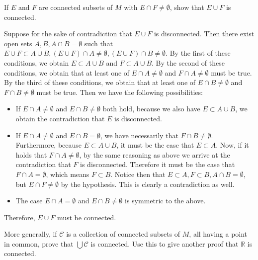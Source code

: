 \begin{exercise}{5}
    If $E$ and $F$ are connected subsets of $M$ with $E \cap F \neq \emptyset$, show that $E \cup F$ is connected.
\end{exercise}

\begin{solution}
    
    Suppose for the sake of contradiction that $E \cup F$ is disconnected.
    Then there exist open sets $A, B, A \cap B = \emptyset$ such that $E \cup F \subset A \cup B, (E \cup F) \cap A \neq \emptyset, (E \cup F) \cap B \neq \emptyset$.
    By the first of these conditions, we obtain $E \subset A \cup B$ and $F \subset A \cup B$.
    By the second of these conditions, we obtain that at least one of $E \cap A \neq \emptyset$ and $F \cap A \neq \emptyset$ must be true.
    By the third of these conditions, we obtain that at least one of $E \cap B \neq \emptyset$ and $F \cap B \neq \emptyset$ must be true.
    Then we have the following possibilities:
    \begin{itemize}
        \item If $E \cap A \neq \emptyset$ and $E \cap B \neq \emptyset$ both hold, because we also have $E \subset A \cup B$, we obtain the contradiction that $E$ is disconnected.
        \item If $E \cap A \neq \emptyset$ and $E \cap B = \emptyset$, we have necessarily that $F \cap B \neq \emptyset$.
        Furthermore, because $E \subset A \cup B$, it must be the case that $E \subset A$.
        Now, if it holds that $F \cap A \neq \emptyset$, by the same reasoning as above we arrive at the contradiction that $F$ is disconnected.
        Therefore it must be the case that $F \cap A = \emptyset$, which means $F \subset B$.
        Notice then that $E \subset A, F \subset B, A \cap B = \emptyset$, but $E \cap F \neq \emptyset$ by the hypothesis.
        This is clearly a contradiction as well.
        \item The case $E \cap A = \emptyset$ and $E \cap B \neq \emptyset$ is symmetric to the above.
    \end{itemize}
    Therefore, $E \cup F$ must be connected.
\end{solution}

\begin{exercise}{6}
    More generally, if $\mathcal{C}$ is a collection of connected subsets of $M$, all having a point in common, prove that $\bigcup \mathcal{C}$ is connected.
    Use this to give another proof that $\mathbb{R}$ is connected.
\end{exercise}

